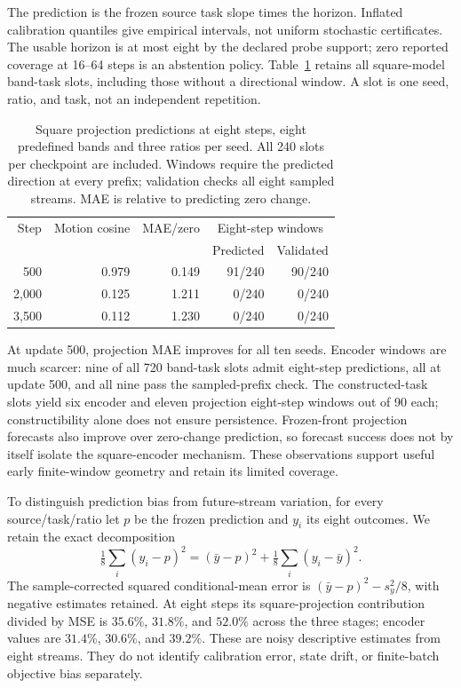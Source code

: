 The prediction is the frozen source task slope times the horizon. Inflated calibration quantiles give empirical intervals, not uniform stochastic certificates. The usable horizon is at most eight by the declared probe support; zero reported coverage at 16--64 steps is an abstention policy. Table~\ref{tab:frozen-source} retains all square-model band-task slots, including those without a directional window. A slot is one seed, ratio, and task, not an independent repetition.

\begin{table}[t]
\centering\small
\caption{Square projection predictions at eight steps, eight predefined bands and three ratios per seed. All 240 slots per checkpoint are included. Windows require the predicted direction at every prefix; validation checks all eight sampled streams. MAE is relative to predicting zero change.}
\label{tab:frozen-source}
\setlength{\tabcolsep}{3pt}
\begin{tabular}{rrrrr}
\toprule
Step&Motion cosine&MAE/zero&\multicolumn{2}{c}{Eight-step windows}\\
&&&Predicted&Validated\\\midrule
500&0.979&0.149&91/240&90/240\\
2,000&0.125&1.211&0/240&0/240\\
3,500&0.112&1.230&0/240&0/240\\
\bottomrule
\end{tabular}
\end{table}

At update 500, projection MAE improves for all ten seeds. Encoder windows are much scarcer: nine of all 720 band-task slots admit eight-step predictions, all at update 500, and all nine pass the sampled-prefix check. The constructed-task slots yield six encoder and eleven projection eight-step windows out of 90 each; constructibility alone does not ensure persistence. Frozen-front projection forecasts also improve over zero-change prediction, so forecast success does not by itself isolate the square-encoder mechanism. These observations support useful early finite-window geometry and retain its limited coverage.

To distinguish prediction bias from future-stream variation, for every source/task/ratio let $p$ be the frozen prediction and $y_i$ its eight outcomes. We retain the exact decomposition
\begin{equation}
 \tfrac18\sum_i(y_i-p)^2=(\bar y-p)^2
                  +\tfrac18\sum_i(y_i-\bar y)^2.
\end{equation}
The sample-corrected squared conditional-mean error is $(\bar y-p)^2-s_y^2/8$, with negative estimates retained. At eight steps its square-projection contribution divided by MSE is $35.6\%$, $31.8\%$, and $52.0\%$ across the three stages; encoder values are $31.4\%$, $30.6\%$, and $39.2\%$. These are noisy descriptive estimates from eight streams. They do not identify calibration error, state drift, or finite-batch objective bias separately.

